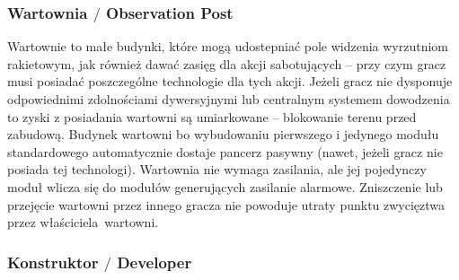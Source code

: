 \documentclass[11pt,a4paper]{article}
\begin{document}
\subsubsection{Wartownia $/$ Observation Post}

Wartownie to małe budynki, które mogą udostepniać pole widzenia wyrzutniom rakietowym, jak również dawać zasięg dla akcji sabotujących -- przy czym gracz musi posiadać poszczególne technologie dla tych akcji. Jeżeli gracz nie dysponuje odpowiednimi zdolnościami dywersyjnymi lub centralnym systemem dowodzenia to zyski z posiadania wartowni są umiarkowane -- blokowanie terenu przed zabudową. Budynek wartowni bo wybudowaniu pierwszego i jedynego modułu standardowego automatycznie dostaje pancerz pasywny (nawet, jeżeli gracz nie posiada tej technologi). Wartownia nie wymaga zasilania, ale jej pojedynczy moduł wlicza się do modułów generujących zasilanie alarmowe. Zniszczenie lub przejęcie wartowni przez innego gracza nie powoduje utraty punktu zwycięztwa przez właściciela~wartowni.

\subsubsection{Konstruktor $/$ Developer}
\end{document}
